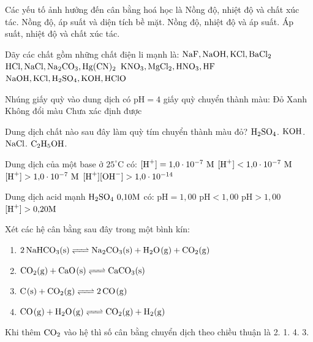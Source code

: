 \documentclass[12pt,a4paper]{article}
\begin{document}
\begin{ex}
Các yếu tố ảnh hưởng đến cân bằng hoá học là
\choice
{Nồng độ, nhiệt độ và chất xúc tác.}
{Nồng độ, áp suất và diện tích bề mặt.}
{Nồng độ, nhiệt độ và áp suất.}
{Áp suất, nhiệt độ và chất xúc tác.}
\loigiai{}
\end{ex}

\begin{ex}
Dãy các chất gồm những chất điện li mạnh là:
\choice
{$\ce{NaF, NaOH, KCl, BaCl2}$}
{$\ce{HCl, NaCl, Na2CO3, Hg(CN)2}$}
{$\ce{KNO3, MgCl2, HNO3, HF}$}
{$\ce{NaOH, KCl, H2SO4, KOH, HClO}$}
\loigiai{}
\end{ex}

\begin{ex}
Nhúng giấy quỳ vào dung dịch có $\text{pH} = 4$ giấy quỳ chuyển thành màu:
\choice
{Đỏ}
{Xanh}
{Không đổi màu}
{Chưa xác định được}
\loigiai{}
\end{ex}

\begin{ex}
Dung dịch chất nào sau đây làm quỳ tím chuyển thành màu đỏ?
\choice
{$\ce{H2SO4}$.}
{$\ce{KOH}$.}
{$\ce{NaCl}$.}
{$\ce{C2H5OH}$.}
\loigiai{}
\end{ex}

\begin{ex}
Dung dịch của một base ở $25^\circ\text{C}$ có:
\choice
{$[\ce{H+}] = 1{,}0 \cdot 10^{-7}\text{ M}$}
{$[\ce{H+}] < 1{,}0 \cdot 10^{-7}\text{ M}$}
{$[\ce{H+}] > 1{,}0 \cdot 10^{-7}\text{ M}$}
{$[\ce{H+}][\ce{OH-}] > 1{,}0 \cdot 10^{-14}$}
\loigiai{}
\end{ex}

\begin{ex}
Dung dịch acid mạnh $\ce{H2SO4}\ 0{,}10\text{M}$ có:
\choice
{$\text{pH} = 1{,}00$}
{$\text{pH} < 1{,}00$}
{$\text{pH} > 1{,}00$}
{$[\ce{H+}] > 0{,}20\text{M}$}
\loigiai{}
\end{ex}

\begin{ex}
Xét các hệ cân bằng sau đây trong một bình kín:
\begin{enumerate}[(1)]
	\item $\ce{2NaHCO3(s) <=> Na2CO3(s) + H2O(g) + CO2(g)}$
	\item $\ce{CO2(g) + CaO(s) <=> CaCO3(s)}$
	\item $\ce{C(s) + CO2(g) <=> 2CO(g)}$
	\item $\ce{CO(g) + H2O(g) <=> CO2(g) + H2(g)}$
\end{enumerate}
Khi thêm $\ce{CO2}$ vào hệ thì số cân bằng chuyển dịch theo chiều thuận là
\choice
{2.}
{1.}
{4.}
{3.}
\loigiai{}
\end{ex}
\end{document}
